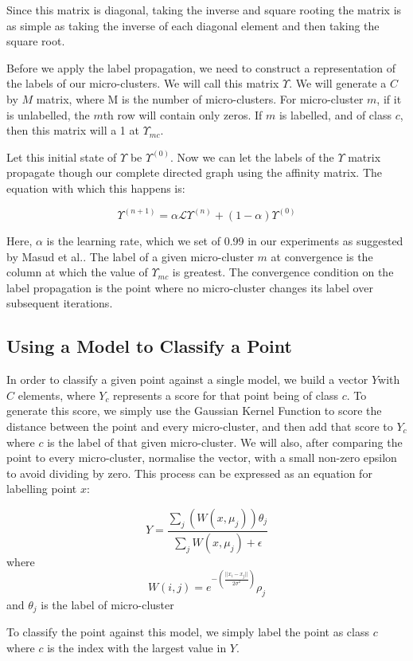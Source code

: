 \documentclass[12pt,a4paper,oneside]{report}
\begin{document}
Since this matrix is diagonal, taking the inverse and square rooting the matrix is as simple as taking the inverse of each diagonal element and then taking the square root.

Before we apply the label propagation, we need to construct a representation of the labels of our micro-clusters. We will call this matrix $\Upsilon$. We will generate a $C$ by $M$ matrix, where M is the number of micro-clusters. For micro-cluster $m$, if it is unlabelled, the $m$th row will contain only zeros. If $m$ is labelled, and of class $c$, then this matrix will a 1 at $\Upsilon_{mc}$.

Let this initial state of $\Upsilon$ be $\Upsilon^{(0)}$. Now we can let the labels of the $\Upsilon$ matrix propagate though our complete directed graph using the affinity matrix. The equation with which this happens is:

\[ \Upsilon^{(n+1)} = \alpha \mathscr{L} \Upsilon^{(n)} + (1 - \alpha) \Upsilon^{(0)}\] 

Here, $\alpha $ is the learning rate, which we set of 0.99 in our experiments as suggested by Masud et al.\cite{TechRep}. The label of a given micro-cluster $m$ at convergence is the column at which the value of $\Upsilon_{mc}$ is greatest. The convergence condition on the label propagation is the point where no micro-cluster changes its label over subsequent iterations. 

\subsection*{Using a Model to Classify a Point}

In order to classify a given point against a single model, we build a vector $Y$with $C$ elements, where $Y_c$ represents a score for that point being of class $c$. To generate this score, we simply use the Gaussian Kernel Function to score the distance between the point and every micro-cluster, and then add that score to $Y_c$ where $c$ is the label of that given micro-cluster. We will also, after comparing the point to every micro-cluster, normalise the vector, with a small non-zero epsilon to avoid dividing by zero. This process can be expressed as an equation for labelling point $x$:

\[ Y = \frac{\sum_j(W(x,\mu_j))\theta_j}{\sum_j{W(x,\mu_j)} + \epsilon} \]
where
\[W(i,j) = e^{-(\frac{||x_i-x_j||}{2\sigma^2})}\rho_j\]
and $\theta_j$ is the label of micro-cluster 

To classify the point against this model, we simply label the point as class $c$ where $c$ is the index with the largest value in $Y$.
\end{document}

